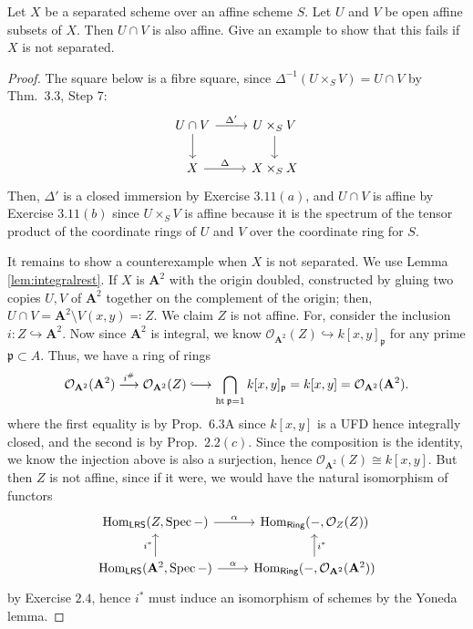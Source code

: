 \documentclass[10pt]{article}
\theoremstyle{definition}
\theoremstyle{remark}
\numberwithin{equation}{section}
\numberwithin{figure}{subsubsection}
\newcommand*{\longhookrightarrow}{\ensuremath{\lhook\joinrel\relbar\joinrel\rightarrow}}
\DeclareMathOperator{\Spec}{Spec}
\DeclareMathOperator{\Hom}{Hom}
\newcommand{\OO}{\mathcal{O}}
\newcommand{\LRS}{\mathsf{LRS}}
\newcommand{\Ring}{\mathsf{Ring}}
\begin{document}
\begin{problem}
  Let $X$ be a separated scheme over an affine scheme $S$. Let $U$ and $V$ be
  open affine subsets of $X$. Then $U \cap V$ is also affine. Give an example to
  show that this fails if $X$ is not separated.
\end{problem}
\begin{proof}
  The square below is a fibre square, since $\Delta^{-1}(U \times_S V) = U \cap
  V$ by Thm.\ 3.3, Step 7:
  \begin{equation*}
    \begin{tikzcd}
      U \cap V \rar{\Delta'}\dar & U \times_S V\dar\\
      X \rar{\Delta} & X \times_S X
    \end{tikzcd}
  \end{equation*}
  Then, $\Delta'$ is a closed immersion by Exercise $3.11(a)$, and
  $U \cap V$ is affine by Exercise $3.11(b)$ since $U \times_S V$ is affine
  because it is the spectrum of the tensor product of the coordinate rings of
  $U$ and $V$ over the coordinate ring for $S$.
  \par It remains to show a counterexample when $X$ is not separated.
  We use Lemma \ref{lem:integralrest}. If $X$ is
  $\mathbf{A}^2$ with the origin doubled, constructed by gluing two copies $U,V$ of
  $\mathbf{A}^2$ together on the complement of the origin; then, $U \cap V =
  \mathbf{A}^2 \setminus V(x,y) \eqqcolon Z$. We claim $Z$ is not affine. For,
  consider the inclusion $i\colon Z \hookrightarrow \mathbf{A}^2$. Now since
  $\mathbf{A}^2$ is integral, we know $\OO_{\mathbf{A}^2}(Z) \hookrightarrow
  k[x,y]_\mathfrak{p}$ for any prime $\mathfrak{p} \subset A$. Thus, we have a
  ring of rings
  \begin{equation*}
    \OO_{\mathbf{A}^2}(\mathbf{A}^2) \overset{i^\#}\longrightarrow
    \OO_{\mathbf{A}^2}(Z) \longhookrightarrow
    \bigcap_{\operatorname{ht} \mathfrak{p}=1} k[x,y]_\mathfrak{p} = k[x,y] =
    \OO_{\mathbf{A}^2}(\mathbf{A}^2).
  \end{equation*}
  where the first equality is by Prop.\ 6.3A since $k[x,y]$ is a UFD hence
  integrally closed, and the second is by Prop.\ $2.2(c)$.
  Since the composition is the identity, we know the injection above is also a
  surjection, hence $\OO_{\mathbf{A}^2}(Z) \cong k[x,y]$. But then $Z$ is not
  affine, since if it were, we would have the natural isomorphism of functors
  \begin{equation*}
    \begin{tikzcd}
      \Hom_\LRS(Z,\Spec-) \rar{\alpha} & \Hom_\Ring(-,\OO_Z(Z))\\
      \Hom_\LRS(\mathbf{A}^2,\Spec-) \rar{\alpha}\uar{i^*} &
      \Hom_\Ring(-,\OO_{\mathbf{A}^2}(\mathbf{A}^2))\uar[swap]{i^*}
    \end{tikzcd}
  \end{equation*}
  by Exercise $2.4$, hence $i^*$ must induce an isomorphism of schemes by the
  Yoneda lemma.
\end{proof}
\end{document}
